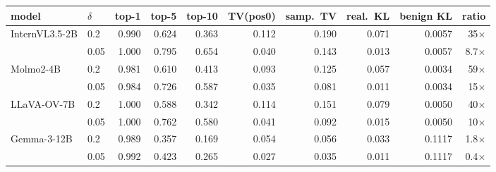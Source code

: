 \footnotesize
\setlength{\tabcolsep}{4.5pt}
\begin{tabular}{@{}llrrrrrrrr@{}}
\toprule
model & $\delta$ & top-1 & top-5 & top-10 & TV(pos0) & samp.\ TV & real.\ KL & benign KL & ratio \\
\midrule
\multirow{2}{*}{InternVL3.5-2B} & 0.2 & 0.990 & 0.624 & 0.363 & 0.112 & 0.190 & 0.071 & 0.0057 & 35$\times$ \\
 & 0.05 & 1.000 & 0.795 & 0.654 & 0.040 & 0.143 & 0.013 & 0.0057 & 8.7$\times$ \\
\midrule
\multirow{2}{*}{Molmo2-4B} & 0.2 & 0.981 & 0.610 & 0.413 & 0.093 & 0.125 & 0.057 & 0.0034 & 59$\times$ \\
 & 0.05 & 0.984 & 0.726 & 0.587 & 0.035 & 0.081 & 0.011 & 0.0034 & 15$\times$ \\
\midrule
\multirow{2}{*}{LLaVA-OV-7B} & 0.2 & 1.000 & 0.588 & 0.342 & 0.114 & 0.151 & 0.079 & 0.0050 & 40$\times$ \\
 & 0.05 & 1.000 & 0.762 & 0.580 & 0.041 & 0.092 & 0.015 & 0.0050 & 10$\times$ \\
\midrule
\multirow{2}{*}{Gemma-3-12B} & 0.2 & 0.989 & 0.357 & 0.169 & 0.054 & 0.056 & 0.033 & 0.1117 & 1.8$\times$ \\
 & 0.05 & 0.992 & 0.423 & 0.265 & 0.027 & 0.035 & 0.011 & 0.1117 & 0.4$\times$ \\
\bottomrule
\end{tabular}

\vspace{3pt}
